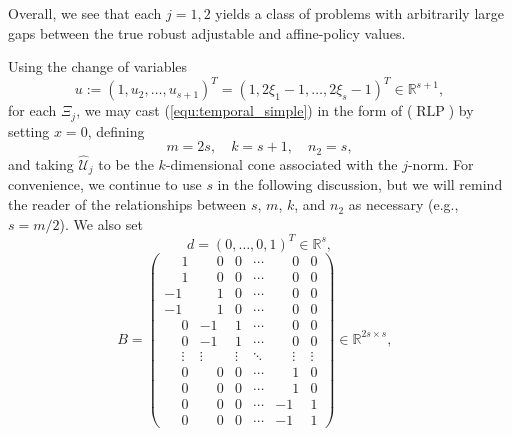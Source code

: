 \documentclass[12pt]{article}
\DeclareMathOperator{\AR}{RLP}
\newcommand{\K}{\widehat{\mathcal{U}}}
\def\RR{{\mathbb{R}}}
\begin{document}
\begin{onehalfspace}
\noindent Overall, we see that each $j = 1,2$ yields a class of
problems with arbitrarily large gaps between the true robust adjustable
and affine-policy values.

Using the change of variables
\[
    u := (1, u_2, \ldots, u_{s+1})^T = (1, 2 \xi_1 - 1, \ldots, 2 \xi_s - 1)^T \in \RR^{s+1},
\]
for each $\Xi_j$, we may cast (\ref{equ:temporal_simple}) in the form
of ($\AR$) by setting $x = 0$, defining
\[
    m = 2s, \quad k = s + 1, \quad n_2 = s,
\]
and taking $\K_j$ to be the $k$-dimensional cone associated with the
$j$-norm. For convenience, we continue to use $s$
in the following discussion, but we will remind the reader of the
relationships between $s$, $m$, $k$, and $n_2$ as necessary (e.g., $s =
m/2$). We also set
\[
    d = (0,\ldots,0,1)^T \in \RR^s,
\]
\[
B = \begin{pmatrix}
       \phantom{-}1 & \phantom{-}0 & 0 & \cdots & \phantom{-}0 & 0 \\
       \phantom{-}1 & \phantom{-}0 & 0 & \cdots & \phantom{-}0 & 0 \\
      -1 & \phantom{-}1 & 0 & \cdots & \phantom{-}0 & 0 \\
      -1 & \phantom{-}1 & 0 & \cdots & \phantom{-}0 & 0 \\
       \phantom{-}0 & -1 & 1 & \cdots & \phantom{-}0 & 0 \\
       \phantom{-}0 & -1 & 1 & \cdots & \phantom{-}0 & 0 \\
\phantom{-}\vdots & \vdots & \vdots & \ddots & \phantom{-}\vdots & \vdots \\
       \phantom{-}0 & \phantom{-}0 & 0 & \cdots & \phantom{-}1 & 0 \\
       \phantom{-}0 & \phantom{-}0 & 0 & \cdots & \phantom{-}1 & 0 \\
       \phantom{-}0 & \phantom{-}0 & 0 & \cdots & -1 & 1 \\
       \phantom{-}0 & \phantom{-}0 & 0 & \cdots & -1 & 1 
\end{pmatrix} \in \RR^{2s \times s}, \ \ \
\]
\end{onehalfspace}
\end{document}
